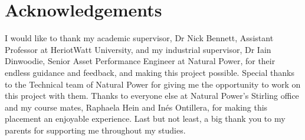 \chapter{Acknowledgements}

I would like to thank my academic supervisor, Dr Nick Bennett, Assistant Professor at HeriotWatt University, and my industrial supervisor, Dr Iain Dinwoodie, Senior Asset Performance Engineer at Natural Power, for their endless guidance and feedback, and making this project possible. Special thanks to the Technical team of Natural Power for giving me the opportunity to work on this project with them. Thanks to everyone else at Natural Power's Stirling office and my course mates, Raphaela Hein and Inés Ontillera, for making this placement an enjoyable experience. Last but not least, a big thank you to my parents for supporting me throughout my studies.
